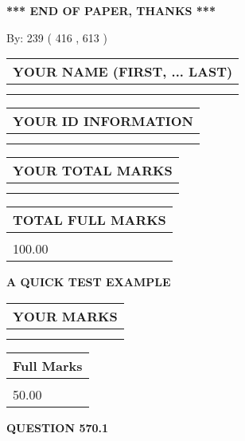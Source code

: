 \documentclass[12pt]{article}
\begin{document}
\vspace{1.0in} 
{\textbf{\large{ *** END OF PAPER, THANKS *** }}} 
   
   
\hspace{1.0in} By: 
 239 ( 416 ,  613 )
   
   
   
   
\newpage 
\setcounter{page}{ 
   570001 } 
   
   
   
   
\noindent\begin{tabular}{|l|}
\hline
YOUR NAME (FIRST, ... LAST)  \\
\hline
 \\ 
 \\ 
\hline
\end{tabular}
\hspace{0.05in} \begin{tabular}{|l|}
\hline
 YOUR   ID   INFORMATION  \\
\hline
 \\ 
 \\ 
\hline
\end{tabular}
   
   
\vspace{0.2in}\noindent\begin{tabular}{|l|}
\hline
YOUR TOTAL MARKS  \\
\hline
 \\ 
 \\ 
\hline
\end{tabular}
\hspace{0.05in} \begin{tabular}{|l|}
\hline
TOTAL FULL MARKS  \\
\hline
 \\ 
100.00 \\
\hline
\end{tabular}
   
   
 \vspace{0.2in}
{\LARGE {\textbf{ A QUICK TEST EXAMPLE}}}
   
   
  
\vspace{0.2in}
  
\noindent\begin{tabular}{|l|}
\hline
 YOUR MARKS  \\
\hline
 \\ 
 \\ 
\hline
\end{tabular}
\hspace{0.05in} \begin{tabular}{|l|}
\hline
 Full Marks  \\
\hline
 \\ 
50.00 \\
\hline
\end{tabular}
{\textbf{\Large{QUESTION
570.1 
}}}
  
\end{document}
